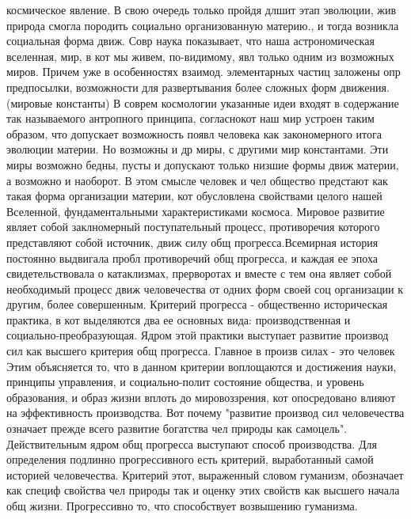\documentclass[12pt]{article}
\begin{document}
космическое явление. В свою очередь только пройдя длшит этап эволюции, жив природа смогла породить
социально организованную материю., и тогда возникла социальная форма движ.
Совр наука показывает, что наша астрономическая вселенная, мир, в кот мы живем, по-видимому, явл только
одним  из  возможных  миров.  Причем  уже  в  особенностях  взаимод.  элементарных  частиц  заложены  опр
предпосылки, возможности для развертывания более сложных форм движения. (мировые константы)
В соврем космологии указанные идеи входят в содержание так называемого антропного принципа, согласнокот
наш мир устроен таким образом, что допускает возможность появл человека как закономерного итога эволюции
материи. Но возможны и др миры, с другими мир константами. Эти миры возможно бедны, пусты и допускают
только низшие формы движ материи, а возможно и наоборот. В этом смысле человек и чел общество предстают
как  такая  форма  организации  материи,  кот  обусловлена  свойствами  целого  нашей  Вселенной,
фундаментальными характеристиками космоса. 
Мировое развитие являет собой заклномерный поступательный процесс, противоречия которого представляют
собой источник, движ силу общ прогресса.Всемирная история постоянно выдвигала пробл противоречий общ
прогресса, и каждая ее эпоха свидетельствовала о катаклизмах, прерворотах и вместе с тем она являет собой
необходимый процесс движ человечества от одних форм своей соц организации к другим, более совершенным. 
Критерий  прогресса  -  общественно  историческая  практика,  в  кот  выделяются  два  ее  основных  вида:
производственная и социально-преобразующая. Ядром этой практики выступает развитие производ сил как
высшего критерия общ прогресса. Главное в произв силах - это человек Этим объясняется то, что в данном
критерии воплощаются и достижения науки, принципы управления, и социально-полит состояние общества, и
уровень образования, и образ жизни вплоть до мировоззрения, кот опосредовано влияют на эффективность
производства. Вот почему "развитие производ сил человечества означает прежде всего развитие богатства чел
природы как самоцель". Действительным ядром общ прогресса выступают способ производства.
Для  определения  подлинно  прогрессивного  есть  критерий,  выработанный  самой  историей  человечества.
Критерий этот, выраженный словом гуманизм, обозначает как специф свойства чел природы так и оценку этих
свойств как высшего начала общ жизни. Прогрессивно то, что способствует возвышению гуманизма.
\end{document}
